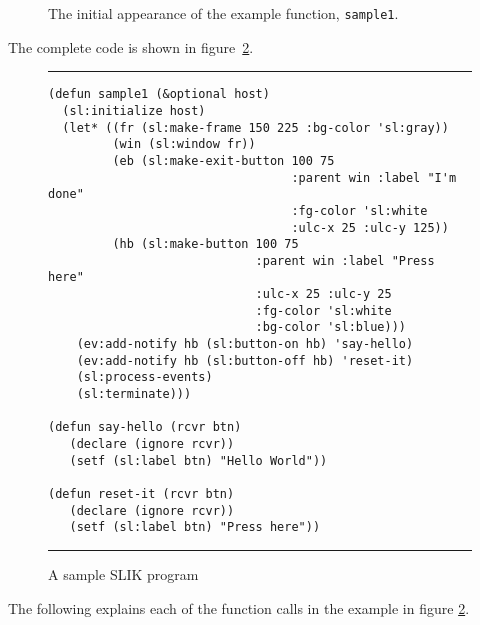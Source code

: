 \documentclass[twoside,openright,11pt]{report}
\newcommand{\tp}[1]{\texttt{#1}}
\begin{document}
\begin{figure}[htb]
\begin{center}
\vspace*{4mm}
\leavevmode
{}
\end{center}
\caption{The initial appearance of the example function,
\tp{sample1}.} \label{fig:sample1-screen}
\end{figure}

The complete code is shown in figure~\ref{fig:sample1}.

\begin{figure}[htb]

\rule{\textwidth}{1mm}

\begin{verbatim}
(defun sample1 (&optional host)
  (sl:initialize host)
  (let* ((fr (sl:make-frame 150 225 :bg-color 'sl:gray))
         (win (sl:window fr))
         (eb (sl:make-exit-button 100 75
                                  :parent win :label "I'm done"
                                  :fg-color 'sl:white
                                  :ulc-x 25 :ulc-y 125))
         (hb (sl:make-button 100 75
                             :parent win :label "Press here"
                             :ulc-x 25 :ulc-y 25
                             :fg-color 'sl:white
                             :bg-color 'sl:blue)))
    (ev:add-notify hb (sl:button-on hb) 'say-hello)
    (ev:add-notify hb (sl:button-off hb) 'reset-it)
    (sl:process-events)
    (sl:terminate)))

(defun say-hello (rcvr btn)
   (declare (ignore rcvr))
   (setf (sl:label btn) "Hello World"))

(defun reset-it (rcvr btn)
   (declare (ignore rcvr))
   (setf (sl:label btn) "Press here"))
\end{verbatim}

\rule{\textwidth}{1mm}

\caption{A sample SLIK program} \label{fig:sample1}

\end{figure}

The following explains each of the function calls in the example in
figure \ref{fig:sample1}.
\end{document}
